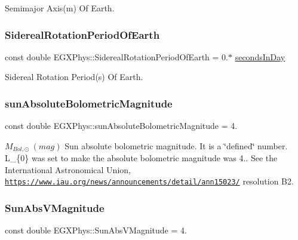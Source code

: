 Semimajor Axis(m) Of Earth. \mbox{\label{namespace_e_g_x_phys_a34a388ac3f9196bb3cdbdbee5ff3cdb7}} 
\subsubsection{\texorpdfstring{Sidereal\+Rotation\+Period\+Of\+Earth}{SiderealRotationPeriodOfEarth}}
{\footnotesize\ttfamily const double E\+G\+X\+Phys\+::\+Sidereal\+Rotation\+Period\+Of\+Earth = 0.$\ast$ \mbox{\hyperlink{namespace_e_g_x_phys_ab4f86327f64403b843077ecc189ce52b}{seconds\+In\+Day}}}

Sidereal Rotation Period(s) Of Earth. \mbox{\label{namespace_e_g_x_phys_a4ac32f61eb3abee399574dc1acc51b4b}} 
\subsubsection{\texorpdfstring{sun\+Absolute\+Bolometric\+Magnitude}{sunAbsoluteBolometricMagnitude}}
{\footnotesize\ttfamily const double E\+G\+X\+Phys\+::sun\+Absolute\+Bolometric\+Magnitude = 4.}

$M_{Bol,\odot} \ (mag)$ Sun absolute bolometric magnitude. It is a \char`\"{}defined\char`\"{} number. L\+\_\+\{0\} was set to make the absolute bolometric magnitude was 4.. See the International Astronomical Union, \href{https://www.iau.org/news/announcements/detail/ann15023/}{\tt https\+://www.\+iau.\+org/news/announcements/detail/ann15023/} resolution B2. \mbox{\label{namespace_e_g_x_phys_a61266dc1aaacdd9a9bd0f2fa92aa21c9}} 
\subsubsection{\texorpdfstring{Sun\+Abs\+V\+Magnitude}{SunAbsVMagnitude}}
{\footnotesize\ttfamily const double E\+G\+X\+Phys\+::\+Sun\+Abs\+V\+Magnitude = 4.}

